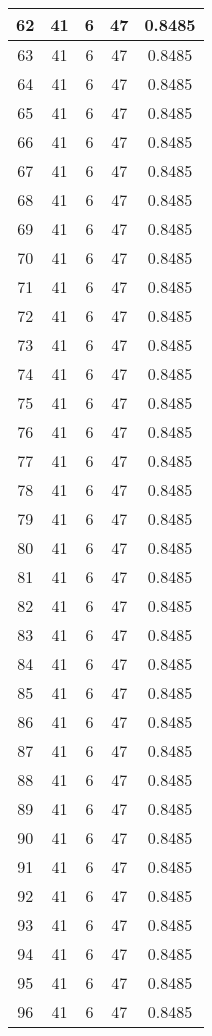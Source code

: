 \documentclass[letterpaper, 12pt]{article}
\begin{document}
\begin{longtable}{|c|c|c|c|c|}
\hline
62 & 41 & 6 & 47 & 0.8485 \\
\hline
63 & 41 & 6 & 47 & 0.8485 \\
\hline
64 & 41 & 6 & 47 & 0.8485 \\
\hline
65 & 41 & 6 & 47 & 0.8485 \\
\hline
66 & 41 & 6 & 47 & 0.8485 \\
\hline
67 & 41 & 6 & 47 & 0.8485 \\
\hline
68 & 41 & 6 & 47 & 0.8485 \\
\hline
69 & 41 & 6 & 47 & 0.8485 \\
\hline
70 & 41 & 6 & 47 & 0.8485 \\
\hline
71 & 41 & 6 & 47 & 0.8485 \\
\hline
72 & 41 & 6 & 47 & 0.8485 \\
\hline
73 & 41 & 6 & 47 & 0.8485 \\
\hline
74 & 41 & 6 & 47 & 0.8485 \\
\hline
75 & 41 & 6 & 47 & 0.8485 \\
\hline
76 & 41 & 6 & 47 & 0.8485 \\
\hline
77 & 41 & 6 & 47 & 0.8485 \\
\hline
78 & 41 & 6 & 47 & 0.8485 \\
\hline
79 & 41 & 6 & 47 & 0.8485 \\
\hline
80 & 41 & 6 & 47 & 0.8485 \\
\hline
81 & 41 & 6 & 47 & 0.8485 \\
\hline
82 & 41 & 6 & 47 & 0.8485 \\
\hline
83 & 41 & 6 & 47 & 0.8485 \\
\hline
84 & 41 & 6 & 47 & 0.8485 \\
\hline
85 & 41 & 6 & 47 & 0.8485 \\
\hline
86 & 41 & 6 & 47 & 0.8485 \\
\hline
87 & 41 & 6 & 47 & 0.8485 \\
\hline
88 & 41 & 6 & 47 & 0.8485 \\
\hline
89 & 41 & 6 & 47 & 0.8485 \\
\hline
90 & 41 & 6 & 47 & 0.8485 \\
\hline
91 & 41 & 6 & 47 & 0.8485 \\
\hline
92 & 41 & 6 & 47 & 0.8485 \\
\hline
93 & 41 & 6 & 47 & 0.8485 \\
\hline
94 & 41 & 6 & 47 & 0.8485 \\
\hline
95 & 41 & 6 & 47 & 0.8485 \\
\hline
96 & 41 & 6 & 47 & 0.8485 \\

\end{longtable}
\end{document}
